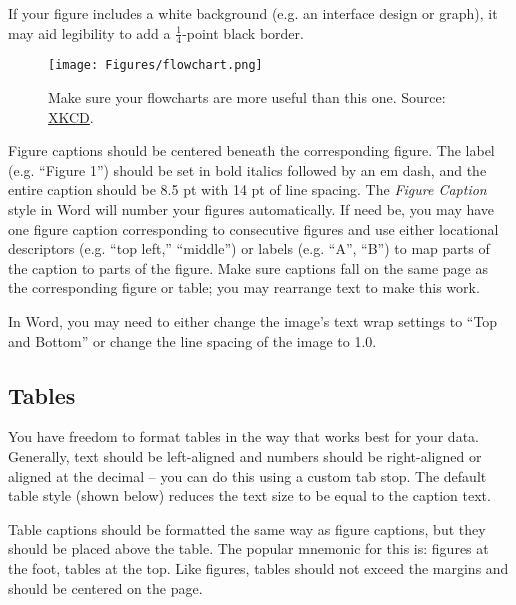 \documentclass[
	letterpaper, %
]{jdf}
\begin{document}
If your figure includes a white background (e.g. an interface design or graph), it may aid legibility to add a \(\frac{1}{4}\)-point black border.

\begin{figure}[h]
	\centering
	\texttt{[image: Figures/flowchart.png]}
	\caption{Make sure your flowcharts are more useful than this one. Source: \href{https://xkcd.com/1195/}{XKCD}.}
	\label{fig:flowchart}
\end{figure}

Figure captions should be centered beneath the corresponding figure. The label (e.g. “Figure 1”) should be set in bold italics followed by an em dash, and the entire caption should be 8.5 pt with 14 pt of line spacing. The \emph{Figure Caption} style in Word will number your figures automatically. If need be, you may have one figure caption corresponding to consecutive figures and use either locational descriptors (e.g. “top left,” “middle”) or labels (e.g. “A”, “B”) to map parts of the caption to parts of the figure. Make sure captions fall on the same page as the corresponding figure or table; you may rearrange text to make this work.

In Word, you may need to either change the image’s text wrap settings to “Top and Bottom” or change the line spacing of the image to 1.0.

\subsection{Tables}
You have freedom to format tables in the way that works best for your data. Generally, text should be left-aligned and numbers should be right-aligned or aligned at the decimal – you can do this using a custom tab stop. The default table style (shown below) reduces the text size to be equal to the caption text.

Table captions should be formatted the same way as figure captions, but they should be placed above the table. The popular mnemonic for this is: figures at the foot, tables at the top. Like figures, tables should not exceed the margins and should be centered on the page.
\end{document}
